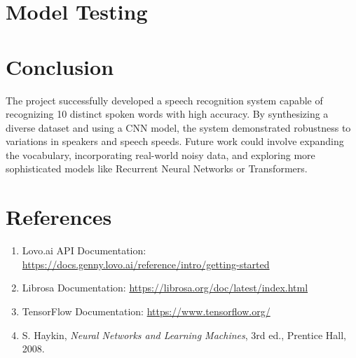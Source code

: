 \documentclass[12pt]{article}
\begin{document}
\section{Model Testing}



\newpage




\section{Conclusion}

The project successfully developed a speech recognition system capable of recognizing 10 distinct spoken words with high accuracy. By synthesizing a diverse dataset and using a CNN model, the system demonstrated robustness to variations in speakers and speech speeds. Future work could involve expanding the vocabulary, incorporating real-world noisy data, and exploring more sophisticated models like Recurrent Neural Networks or Transformers.

\section*{References}

\begin{enumerate}
    \item Lovo.ai API Documentation: \url{https://docs.genny.lovo.ai/reference/intro/getting-started}
    \item Librosa Documentation: \url{https://librosa.org/doc/latest/index.html}
    \item TensorFlow Documentation: \url{https://www.tensorflow.org/}
    \item S. Haykin, \textit{Neural Networks and Learning Machines}, 3rd ed., Prentice Hall, 2008.
\end{enumerate}
\end{document}
